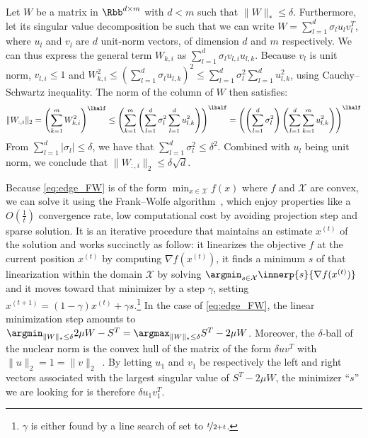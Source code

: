 \begin{aside}
  Let $W$ be a matrix in $\Rbb^{d\times m}$ with $d < m$ such that $\|W\|_* \leq \delta$.
  Furthermore, let its singular value decomposition be such that we can write $W = \sum_{l=1}^d
  \sigma_l u_l v_l^T$, where $u_l$ and $v_l$ are $d$ unit-norm vectors, of dimension $d$ and $m$
  respectively. We can thus express the general term $W_{k,i}$ as $\sum_{l=1}^d \sigma_l v_{l,i}
  u_{l,k}$. Because $v_l$ is unit norm, $v_{l,i} \leq 1$ and $W_{k,i}^2 \leq \left( \sum_{l=1}^d
  \sigma_l u_{l,k} \right)^2 \leq \sum_{l=1}^d \sigma_l^2 \sum_{l=1}^d u_{l,k}^2$, using
  Cauchy--Schwartz inequality. The norm of the \ith{} column of $W$ then satisfies:
  \begin{equation*}
    \|W_{:,i}\|_2 = \left( \sum_{k=1}^m W_{k,i}^2 \right)^\lhalf
    \leq \left( \sum_{k=1}^m \left( \sum_{l=1}^d \sigma_l^2 \sum_{l=1}^d u_{l,k}^2 \right) \right)^\lhalf
    = \left( \left( \sum_{l=1}^d \sigma_l^2 \right) \left( \sum_{l=1}^d \sum_{k=1}^m u_{l,k}^2 \right) \right)^\lhalf
  \end{equation*}
  From $\sum_{l=1}^d |\sigma_l | \leq \delta$, we have that $\sum_{l=1}^d \sigma_l^2 \leq \delta^2$.
  Combined with $u_l$ being unit norm, we conclude that $\|W_{:,i}\|_2 \leq \delta\sqrt{d}$.
\end{aside}

Because \eqref{eq:edge_FW} is of the form $\min_{x\in \mathcal{X}} f(x)$ where $f$ and $\mathcal{X}$
are convex, we can solve it using the Frank--Wolfe algorithm~\autocites{FrankWolfe56}{Jaggi2013a},
which enjoy properties like a $O(\frac{1}{t})$ convergence rate, low computational cost by avoiding
projection step and sparse solution. It is an iterative procedure that maintains an estimate
$x^{(t)}$ of the solution and works succinctly as follow: it linearizes the objective $f$ at the
current position $x^{(t)}$ by computing $\nabla f(x^{(t)})$, it finds a minimum $s$ of that
linearization within the domain $\mathcal{X}$ by solving $\argmin_{s\in \mathcal{X}}
\innerp{s}{\nabla f(x^{(t)})}$ and it moves toward that minimizer by a step $\gamma$, setting
$x^{(t+1)} = (1-\gamma) x^{(t)} + \gamma s$.\footnote{$\gamma$ is either found by a line search of
set to $\nicefrac{t}{2+t}$.} In the case of \eqref{eq:edge_FW}, the linear minimization step amounts
to $\argmin_{\|W\|_* \leq \delta} 2\mu W - S^T = \argmax_{\|W\|_* \leq \delta} S^T - 2\mu W$.
Moreover, the $\delta$-ball of the nuclear norm is the convex hull of the matrix of the form $\delta
u v^T$ with $\|u\|_2 = 1 = \|v\|_2$~\autocite{Jaggi2013a}. By letting $u_1$ and $v_1$ be
respectively the left and right vectors associated with the largest singular value of $S^T - 2\mu
W$, the minimizer \enquote{$s$} we are looking for is therefore $\delta u_1 v_1^T$.

